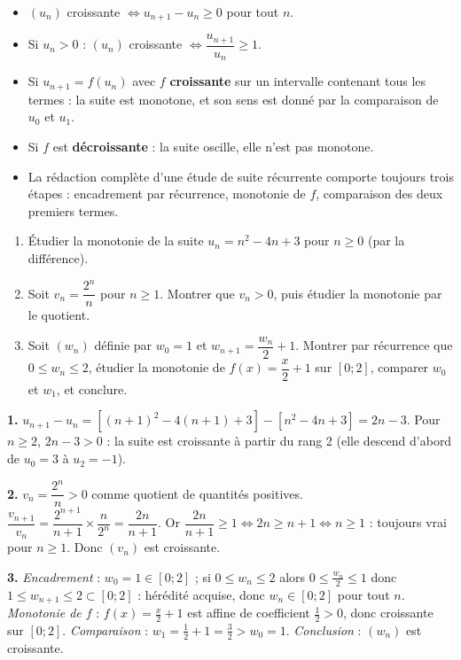\documentclass[11pt]{article}
\begin{document}
\begin{aretenir}
\begin{itemize}
\item $(u_n)$ croissante $\iff u_{n+1} - u_n \geq 0$ pour tout $n$.
\item Si $u_n > 0$ : $(u_n)$ croissante $\iff \dfrac{u_{n+1}}{u_n} \geq 1$.
\item Si $u_{n+1} = f(u_n)$ avec $f$ \textbf{croissante} sur un intervalle contenant tous les termes : la suite est monotone, et son sens est donné par la comparaison de $u_0$ et $u_1$.
\item Si $f$ est \textbf{décroissante} : la suite oscille, elle n'est pas monotone.
\item La rédaction complète d'une étude de suite récurrente comporte toujours trois étapes : encadrement par récurrence, monotonie de $f$, comparaison des deux premiers termes.
\end{itemize}
\end{aretenir}

\begin{exercice}
\begin{enumerate}
\item Étudier la monotonie de la suite $u_n = n^2 - 4n + 3$ pour $n \geq 0$ (par la différence).
\item Soit $v_n = \dfrac{2^n}{n}$ pour $n \geq 1$. Montrer que $v_n > 0$, puis étudier la monotonie par le quotient.
\item Soit $(w_n)$ définie par $w_0 = 1$ et $w_{n+1} = \dfrac{w_n}{2} + 1$. Montrer par récurrence que $0 \leq w_n \leq 2$, étudier la monotonie de $f(x) = \dfrac{x}{2}+1$ sur $[0;2]$, comparer $w_0$ et $w_1$, et conclure.
\end{enumerate}
\end{exercice}

\begin{corrige}[Exercices 1 à 3]
\textbf{1.} $u_{n+1} - u_n = [(n+1)^2 - 4(n+1) + 3] - [n^2 - 4n + 3] = 2n - 3$. Pour $n \geq 2$, $2n-3 > 0$ : la suite est croissante à partir du rang 2 (elle descend d'abord de $u_0=3$ à $u_2 = -1$).

\textbf{2.} $v_n = \dfrac{2^n}{n} > 0$ comme quotient de quantités positives. $\dfrac{v_{n+1}}{v_n} = \dfrac{2^{n+1}}{n+1}\times\dfrac{n}{2^n} = \dfrac{2n}{n+1}$. Or $\dfrac{2n}{n+1} \geq 1 \iff 2n \geq n+1 \iff n \geq 1$ : toujours vrai pour $n \ge 1$. Donc $(v_n)$ est croissante.

\textbf{3.} \emph{Encadrement} : $w_0 = 1 \in [0;2]$ ; si $0 \leq w_n \leq 2$ alors $0 \leq \tfrac{w_n}{2} \leq 1$ donc $1 \leq w_{n+1} \leq 2 \subset [0;2]$ : hérédité acquise, donc $w_n \in [0;2]$ pour tout $n$. \emph{Monotonie de $f$} : $f(x) = \tfrac{x}{2}+1$ est affine de coefficient $\tfrac12 > 0$, donc croissante sur $[0;2]$. \emph{Comparaison} : $w_1 = \tfrac{1}{2}+1 = \tfrac32 > w_0 = 1$. \emph{Conclusion} : $(w_n)$ est croissante.
\end{corrige}
\end{document}
